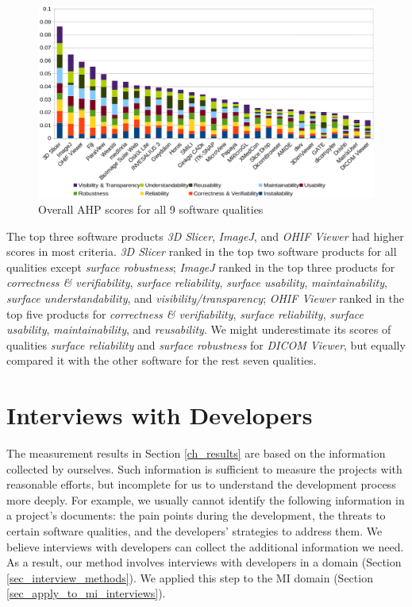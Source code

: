 \documentclass[3p, 12pt,authoryear]{elsarticle}
\begin{document}
\begin{figure}[ht]
\includegraphics[scale=0.38]{figures/overall_scores.png}
\caption{Overall AHP scores for all 9 software qualities}

\label{fg_overall_scores}
\end{figure}

The top three software products \textit{3D Slicer}, \textit{ImageJ}, and
\textit{OHIF Viewer} had higher scores in most criteria. \textit{3D Slicer}
ranked in the top two software products for all qualities except \textit{surface
robustness}; \textit{ImageJ} ranked in the top three products for
\textit{correctness \& verifiability}, \textit{surface reliability},
\textit{surface usability}, \textit{maintainability}, \textit{ surface
understandability}, and \textit{visibility/transparency}; \textit{OHIF Viewer}
ranked in the top five products for \textit{correctness \& verifiability},
\textit{surface reliability}, \textit{surface usability},
\textit{maintainability}, and \textit{reusability}. We might underestimate its
scores of qualities \textit{surface reliability} and \textit{surface robustness}
for \textit{DICOM Viewer}, but equally compared it with the other software for
the rest seven qualities.

\section{Interviews with Developers} \label{ch_interview}

The measurement results in Section \ref{ch_results} are based on the information
collected by ourselves. Such information is sufficient to measure the projects
with reasonable efforts, but incomplete for us to understand the development
process more deeply. For example, we usually cannot identify the following
information in a project's documents: the pain points during the development,
the threats to certain software qualities, and the developers' strategies to
address them. We believe interviews with developers can collect the additional
information we need. As a result, our method involves interviews with developers
in a domain (Section \ref{sec_interview_methods}). We applied this step to the
MI domain (Section \ref{sec_apply_to_mi_interviews}).
\end{document}
